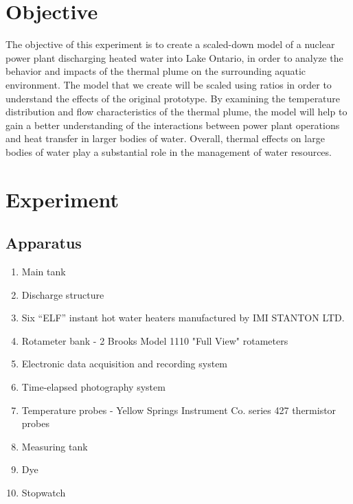 \documentclass{article}
\begin{document}

\newpage
\doublespacing
\tableofcontents
\newpage
{}
\listoftables
{}
\listoffigures
\newpage
\section{Objective} 
\par The objective of this experiment is to create a scaled-down model of a nuclear power plant discharging heated water into Lake Ontario, in order to analyze the behavior and impacts of the thermal plume on the surrounding aquatic environment. The model that we create will be scaled using ratios in order to understand the effects of the original prototype. By examining the temperature distribution and flow characteristics of the thermal plume, the model will help to gain a better understanding of the interactions between power plant operations and heat transfer in larger bodies of water. Overall, thermal effects on large bodies of water play a substantial role in the management of water resources.
\newpage
\section{Experiment}
\subsection{Apparatus}
\begin{enumerate} 
    \item Main tank
    \item Discharge structure
    \item Six ``ELF'' instant hot water heaters manufactured by IMI STANTON LTD.
    \item Rotameter bank - 2 Brooks Model 1110 "Full View" rotameters
    \item Electronic data acquisition and recording system
    \item Time-elapsed photography system
    \item Temperature probes - Yellow Springs Instrument Co. series 427 thermistor probes
    \item Measuring tank 
    \item Dye
    \item Stopwatch
\end{enumerate}
\end{document}
